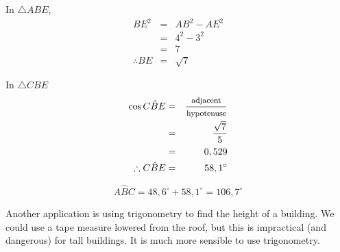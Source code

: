 \begin{wex}
{
In $\triangle ABE$, \\
\begin{eqnarray*}
  BE^{2} & = & AB^{2} - AE^{2} \\
        & = & 4^{2} - 3^{2} \\
        & = & 7 \\
  \therefore BE & = & \sqrt{7}
\end{eqnarray*}

In $\triangle CBE$ 
\begin{eqnarray*}
  \cos C\hat{B}E & = & \frac{\mbox{\footnotesize adjacent}}{\mbox{\footnotesize hypotenuse}} \\
                 & = & \dfrac{\sqrt{7}}{5} \\
                 & = & 0,529 \\
  \therefore C\hat{B}E & = & {58,1}^{\circ}
\end{eqnarray*}

\begin{equation*}
  A\hat{B}C = 48,6^{\circ} + 58,1^{\circ} = 106,7^{\circ}
\end{equation*}
}
\end{wex}

  
Another application is using trigonometry to find the height of a building. We could use a tape measure lowered from the roof, but this is impractical (and dangerous) for tall buildings. It is much more sensible to use trigonometry.\par 

